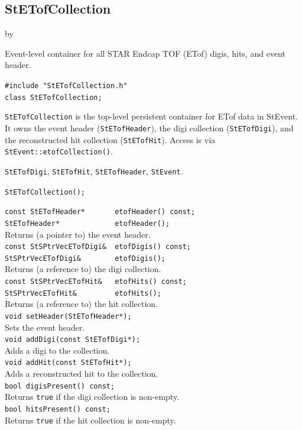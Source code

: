 \documentclass[twoside]{article}
\newcommand{\StEvent}{\textsf{StEvent}}
\newcommand{\entrylabel}[1]{\mbox{\textbf{{#1}}}\hfil}%
\newenvironment{entry}
{\begin{list}{}%
    {\renewcommand{\makelabel}{\entrylabel}%
     \setlength{\labelwidth}{90pt}%
     \setlength{\leftmargin}{\labelwidth}
     \advance\leftmargin by \labelsep%
      }%
    }%
  {\end{list}}
\newcommand{\Entrylabel}[1]%
{\raisebox{0pt}[1ex][0pt]{\makebox[\labelwidth][l]%
    {\parbox[t]{\labelwidth}{\hspace{0pt}\textbf{{#1}}}}}}
\newenvironment{Entry}%
{\renewcommand{\entrylabel}{\Entrylabel}\begin{entry}}%
  {\end{entry}}
\begin{document}
\subsection{StETofCollection}
\label{sec:StETofCollection}
\begin{Entry}
\item[Summary] Event-level container for all STAR Endcap TOF (ETof) digis,
    hits, and event header.
\item[Synopsis]
    \verb+#include "StETofCollection.h"+\\
    \verb+class StETofCollection;+\\
\item[Description]
    \texttt{StETofCollection} is the top-level persistent container for ETof
    data in \StEvent.  It owns the event header (\texttt{StETofHeader}), the
    digi collection (\texttt{StETofDigi}), and the reconstructed hit
    collection (\texttt{StETofHit}).  Access is via
    \verb+StEvent::etofCollection()+.
\item[Related Classes]
    \texttt{StETofDigi}, \texttt{StETofHit}, \texttt{StETofHeader},
    \texttt{StEvent}.
\item[Public\\ Constructors]
    \verb+StETofCollection();+\\
\item[Public Member\\ Functions]
    \verb+const StETofHeader*       etofHeader() const;+\\
    \verb+StETofHeader*             etofHeader();+\\
    Returns (a pointer to) the event header.\\
    \verb+const StSPtrVecETofDigi&  etofDigis() const;+\\
    \verb+StSPtrVecETofDigi&        etofDigis();+\\
    Returns (a reference to) the digi collection.\\
    \verb+const StSPtrVecETofHit&   etofHits() const;+\\
    \verb+StSPtrVecETofHit&         etofHits();+\\
    Returns (a reference to) the hit collection.\\
    \verb+void setHeader(StETofHeader*);+\\
    Sets the event header.\\
    \verb+void addDigi(const StETofDigi*);+\\
    Adds a digi to the collection.\\
    \verb+void addHit(const StETofHit*);+\\
    Adds a reconstructed hit to the collection.\\
    \verb+bool digisPresent() const;+\\
    Returns \verb+true+ if the digi collection is non-empty.\\
    \verb+bool hitsPresent() const;+\\
    Returns \verb+true+ if the hit collection is non-empty.\\
\end{Entry}
\clearpage
\end{document}

